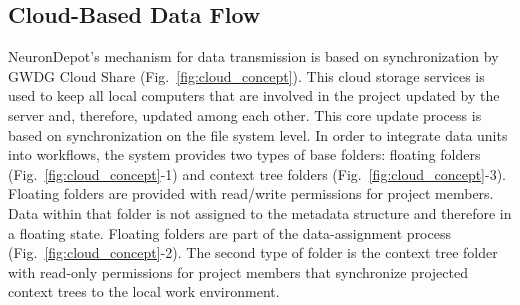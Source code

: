 \documentclass{frontiersSCNS} %
\begin{document}
\subsection{Cloud-Based Data Flow}

NeuronDepot's mechanism for data transmission is based on synchronization by
GWDG Cloud Share (Fig.~\ref{fig:cloud_concept}). This cloud storage services is
used to keep all local computers that are involved in the project updated by
the server and, therefore, updated among each other. This core update process
is based on synchronization on the file system level. In order to integrate
data units into workflows, the system provides two types of base folders:
floating folders (Fig.~\ref{fig:cloud_concept}-1) and context tree folders
(Fig.~\ref{fig:cloud_concept}-3). Floating folders are provided with read/write
permissions for project members. Data within that folder is not assigned to the
metadata structure and therefore in a floating state. Floating folders are part
of the data-assignment process (Fig.~\ref{fig:cloud_concept}-2). The second
type of folder is the context tree folder with read-only permissions for
project members that synchronize projected context trees to the local work
environment.
\end{document}
